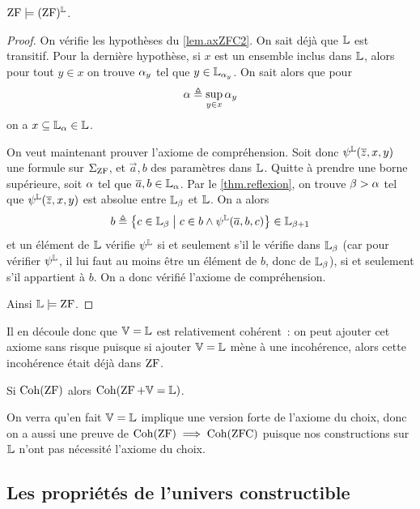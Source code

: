 \begin{theorem}
  $\operatorname{ZF}\models (\operatorname{ZF})^{\mathbb L}$.
\end{theorem}

\begin{proof}
  On vérifie les hypothèses du \cref{lem.axZFC2}. On sait déjà que $\mathbb L$ est
  transitif. Pour la dernière hypothèse, si $x$ est un ensemble inclus dans
  $\mathbb L$, alors pour tout $y \in x$ on trouve $\alpha_y$ tel que
  $y \in \mathbb L_{\alpha_y}$. On sait alors que pour
  \[\alpha \triangleq \sup_{y \in x} \alpha_y\]
  on a $x \subseteq \mathbb L_\alpha \in \mathbb L$.

  On veut maintenant prouver l'axiome de compréhension. Soit donc
  $\psi^{\mathbb L}(\overline{z},x,y)$ une formule sur $\Sigma_{\operatorname{ZF}}$, et $\vec a,b$ des
  paramètres dans $\mathbb L$. Quitte à prendre une borne supérieure, soit $\alpha$
  tel que $\overline{a},b \in \mathbb L_{\alpha}$. Par le \cref{thm.reflexion}, on trouve
  $\beta > \alpha$ tel que $\psi^{\mathbb L}(\overline{z},x,y)$ est absolue entre
  $\mathbb L_\beta$ et $\mathbb L$. On a alors
  \[b\triangleq \left\{ c \in \mathbb L_\beta \;\middle\vert\; c \in b \land
  \psi^{\mathbb L}(\overline{a},b,c) \right\} \in \mathbb L_{\beta + 1}\]
  et un élément de $\mathbb L$ vérifie $\psi^{\mathbb L}$ si et seulement s'il le vérifie
  dans $\mathbb L_{\beta}$ (car pour vérifier $\psi^{\mathbb L}$, il lui faut au moins être
  un élément de $b$, donc de $\mathbb L_\beta$), si et seulement s'il appartient à
  $b$. On a donc vérifié l'axiome de compréhension.

  Ainsi $\mathbb L \models \operatorname{ZF}$.
\end{proof}

Il en découle donc que $\mathbb V = \mathbb L$ est relativement cohérent~: on peut ajouter cet
axiome sans risque puisque si ajouter $\mathbb V = \mathbb L$ mène à une incohérence, alors
cette incohérence était déjà dans $\operatorname{ZF}$.

\begin{corollary}
  Si $\operatorname{Coh}(\operatorname{ZF})$ alors $\operatorname{Coh}(\operatorname{ZF} + \mathbb V = \mathbb L)$.
\end{corollary}

\begin{remark}
  On verra qu'en fait $\mathbb V = \mathbb L$ implique une version forte de l'axiome du choix,
  donc on a aussi une preuve de $\operatorname{Coh}(\operatorname{ZF})\implies \operatorname{Coh}(\operatorname{ZFC})$ puisque nos
  constructions sur $\mathbb L$ n'ont pas nécessité l'axiome du choix.
\end{remark}

\subsection{Les propriétés de l'univers constructible}

